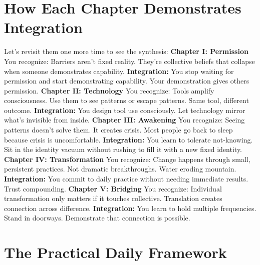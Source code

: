 \section{How Each Chapter Demonstrates Integration}

Let's revisit them one more time to see the synthesis:
\textbf{Chapter I: Permission}
You recognize: Barriers aren't fixed reality. They're collective beliefs that collapse when someone demonstrates capability.
\textbf{Integration:} You stop waiting for permission and start demonstrating capability. Your demonstration gives others permission.
\textbf{Chapter II: Technology}
You recognize: Tools amplify consciousness. Use them to see patterns or escape patterns. Same tool, different outcome.
\textbf{Integration:} You design tool use consciously. Let technology mirror what's invisible from inside.
\textbf{Chapter III: Awakening}
You recognize: Seeing patterns doesn't solve them. It creates crisis. Most people go back to sleep because crisis is uncomfortable.
\textbf{Integration:} You learn to tolerate not-knowing. Sit in the identity vacuum without rushing to fill it with a new fixed identity.
\textbf{Chapter IV: Transformation}
You recognize: Change happens through small, persistent practices. Not dramatic breakthroughs. Water eroding mountain.
\textbf{Integration:} You commit to daily practice without needing immediate results. Trust compounding.
\textbf{Chapter V: Bridging}
You recognize: Individual transformation only matters if it touches collective. Translation creates connection across difference.
\textbf{Integration:} You learn to hold multiple frequencies. Stand in doorways. Demonstrate that connection is possible.

\section{The Practical Daily Framework}

